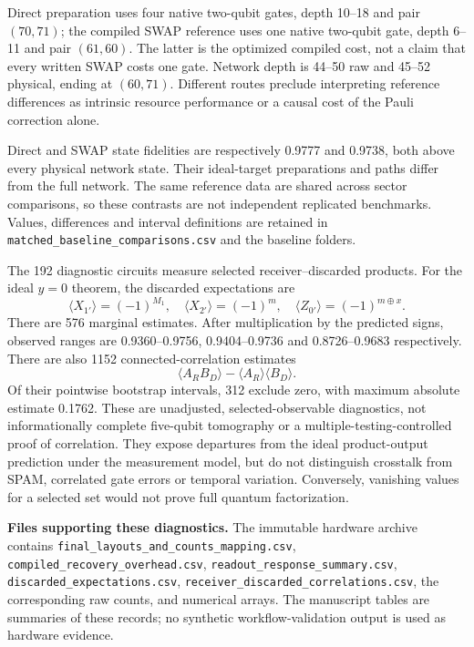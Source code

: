 \documentclass[10pt,a4paper]{article}
\begin{document}
\clearpage
Direct preparation uses four native two-qubit gates, depth 10--18 and pair $(70,71)$; the compiled SWAP reference uses one native two-qubit gate, depth 6--11 and pair $(61,60)$. The latter is the optimized compiled cost, not a claim that every written SWAP costs one gate. Network depth is 44--50 raw and 45--52 physical, ending at $(60,71)$. Different routes preclude interpreting reference differences as intrinsic resource performance or a causal cost of the Pauli correction alone.

Direct and SWAP state fidelities are respectively 0.9777 and 0.9738, both above every physical network state. Their ideal-target preparations and paths differ from the full network. The same reference data are shared across sector comparisons, so these contrasts are not independent replicated benchmarks. Values, differences and interval definitions are retained in \nolinkurl{matched_baseline_comparisons.csv} and the baseline folders.

The 192 diagnostic circuits measure selected receiver--discarded products. For the ideal $y=0$ theorem, the discarded expectations are
\[
\langle X_{1'}\rangle=(-1)^{M_1},\quad
\langle X_{2'}\rangle=(-1)^m,\quad
\langle Z_{0'}\rangle=(-1)^{m\oplus x}.
\]
There are 576 marginal estimates. After multiplication by the predicted signs, observed ranges are 0.9360--0.9756, 0.9404--0.9736 and 0.8726--0.9683 respectively. There are also 1152 connected-correlation estimates
\[
\langle A_R B_D\rangle-\langle A_R\rangle\langle B_D\rangle.
\]
Of their pointwise bootstrap intervals, 312 exclude zero, with maximum absolute estimate 0.1762. These are unadjusted, selected-observable diagnostics, not informationally complete five-qubit tomography or a multiple-testing-controlled proof of correlation. They expose departures from the ideal product-output prediction under the measurement model, but do not distinguish crosstalk from SPAM, correlated gate errors or temporal variation. Conversely, vanishing values for a selected set would not prove full quantum factorization.

\textbf{Files supporting these diagnostics.} The immutable hardware archive contains \nolinkurl{final_layouts_and_counts_mapping.csv}, \nolinkurl{compiled_recovery_overhead.csv}, \nolinkurl{readout_response_summary.csv}, \nolinkurl{discarded_expectations.csv}, \nolinkurl{receiver_discarded_correlations.csv}, the corresponding raw counts, and numerical arrays. The manuscript tables are summaries of these records; no synthetic workflow-validation output is used as hardware evidence.
\end{document}
